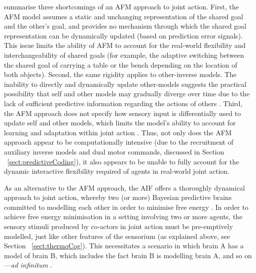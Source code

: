 \begin{CJK}{UTF8}{gbsn}
\textcite{Pesquita2017} summarise three shortcomings of an AFM approach to joint action.  First, the AFM model assumes a static and unchanging representation of the shared goal and the other's goal, and provides no mechanism through which the shared goal representation can be dynamically updated (based on prediction error signals).  This issue limits the ability of AFM to account for the real-world flexibility and interchangeability of shared goals (for example, the adaptive switching between the shared goal of carrying a table or the bench depending on the location of both objects).  Second, the same rigidity applies to other-inverse models.  The inability to directly and dynamically update other-models suggests the practical possibility that self and other models may gradually diverge over time due to the lack of sufficient predictive information regarding the actions of others \citep{Pickering2014}. Third, the AFM approach does not specify how sensory input is differentially used to update self and other models, which limits the model's ability to account for learning and adaptation within joint action \citep{Pesquita2017}.  Thus, not only does the AFM approach appear to be computationally intensive (due to the recruitment of auxiliary inverse models and dual motor commands, discussed in Section ~\ref{sect:predictiveCoding}), it also appears to be unable to fully account for the dynamic interactive flexibility required of agents in real-world joint action.

As an alternative to the AFM approach, the AIF offers a thoroughly dynamical approach to joint action, whereby two (or more) Bayesian predictive brains committed to modelling each other in order to minimise free energy \citep{Friston2015,Friston2015a}. In order to achieve free energy minimisation in a setting involving two or more agents, the sensory stimuli produced by co-actors in joint action must be pre-emptively modelled, just like other features of the sensorium (as explained above, see Section ~\ref{sect:thermoCog}).  This necessitates a scenario in which brain A has a model of brain B, which includes the fact brain B is modelling brain A, and so on---\textit{ad infinitum} \citep{Friston2015}.


\end{CJK}
